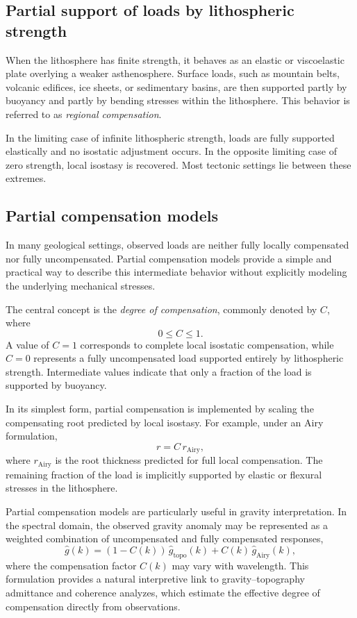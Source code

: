\subsection{Partial support of loads by lithospheric strength}

When the lithosphere has finite strength, it behaves as an elastic or viscoelastic plate overlying a weaker asthenosphere. Surface loads, such as mountain belts, volcanic edifices, ice sheets, or sedimentary basins, are then supported partly by buoyancy and partly by bending stresses within the lithosphere. This behavior is referred to as \emph{regional compensation}.

In the limiting case of infinite lithospheric strength, loads are fully supported elastically and no isostatic adjustment occurs. In the opposite limiting case of zero strength, local isostasy is recovered. Most tectonic settings lie between these extremes.

\subsection{Partial compensation models}

In many geological settings, observed loads are neither fully locally compensated nor fully uncompensated. Partial compensation models provide a simple and practical way to describe this intermediate behavior without explicitly modeling the underlying mechanical stresses.

The central concept is the \emph{degree of compensation}, commonly denoted by \(C\), where
\[
0 \le C \le 1.
\]
A value of \(C=1\) corresponds to complete local isostatic compensation, while \(C=0\) represents a fully uncompensated load supported entirely by lithospheric strength. Intermediate values indicate that only a fraction of the load is supported by buoyancy.

In its simplest form, partial compensation is implemented by scaling the compensating root predicted by local isostasy. For example, under an Airy formulation,
\[
r = C \, r_{\mathrm{Airy}},
\]
where \(r_{\mathrm{Airy}}\) is the root thickness predicted for full local compensation. The remaining fraction of the load is implicitly supported by elastic or flexural stresses in the lithosphere.

Partial compensation models are particularly useful in gravity interpretation. In the spectral domain, the observed gravity anomaly may be represented as a weighted combination of uncompensated and fully compensated responses,
\[
\hat{g}(k)
=
(1-C(k))\,\hat{g}_{\mathrm{topo}}(k)
+
C(k)\,\hat{g}_{\mathrm{Airy}}(k),
\]
where the compensation factor \(C(k)\) may vary with wavelength. This formulation provides a natural interpretive link to gravity--topography admittance and coherence analyzes, which estimate the effective degree of compensation directly from observations.


